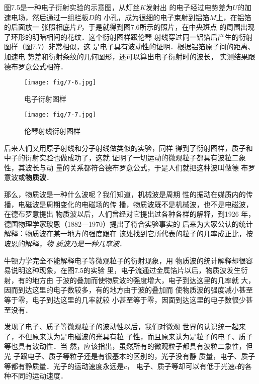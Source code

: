 图7.5是一种电子衍射实验的示意图，从灯丝$K$发射出
的电子经过电势差为$U$的加速电场，然后通过一组栏板$D$的
小孔，成为很细的电子束射到铝箔$M$上，在铝箔的后面放一
张照相底片$P$，于是就得到图7.6所示的照片，在中央斑点
的周围出现了环形的明暗相间的花纹．这个衍射图样跟伦琴
射线穿过同一铝箔后产生的衍射图样（图7.7）非常相似，这
是电子具有波动性的证明．根据铝箔原子间的距离、加速电
势差和衍射条纹的几何图形，还可以算出电子衍射时的波长，
实测结果跟德布罗意公式相符．
\begin{figure}[htp]
    \centering
    \begin{minipage}[t]{0.48\textwidth}
    \centering
    \texttt{[image: fig/7-6.jpg]}
    \caption{电子衍射图样}
    \end{minipage}
    \begin{minipage}[t]{0.48\textwidth}
    \centering
    \texttt{[image: fig/7-7.jpg]}
    \caption{伦琴射线衍射图样}
    \end{minipage}
    \end{figure}


后来人们又用原子射线和分子射线做类似的实验，同样
得到了衍射图样，质子和中子的衍射实验也做成功了，这就
证明了一切运动的微观粒子都具有波粒二象性，其波长与动
量的关系都符合德布罗意公式，于是人们就把这种波叫做德
布罗意波或\textbf{物质波}．

那么，物质波是一种什么波呢？我们知道，机械波是周期
性的振动在媒质内的传播，电磁波是周期变化的电磁场的传
播，物质波既不是机械波，也不是电磁波，在德布罗意提出
物质波以后，人们曾经对它提出过各种各样的解释，到1926
年，德国物理学家玻恩（1882—1970）提出了符合实验事实的
后来为大家公认的统计解释：物质波在某一地方的强度跟在
该处找到它所代表的粒子的几率成正比，按玻恩的解释，\textit{物
质波乃是一种几率波}．

牛顿力学完全不能解释电子等微观粒子的衍射现象，用
物质波的统计解释却很容易说明这种现象，在图7.5的实验
里，电子流通过金属箔片以后，物质波发生衍射，有的地方由
于波的叠加而使物质波的强度增大，电子到达这里的几率就
大，因而到达这里的电子数较多，有的地方由于波的叠加而
使物质波的强度减小甚至等于零，电子到达这里的几率就较
小甚至等于零，因面到达这里的电子数很少甚至没有．

发现了电子、质子等微观粒子的波动性以后，我们对微观
世界的认识统一起来了，不但原来认为是电磁波的光具有粒
子性，而且原来认为是粒子的电子、质子等也具有波动性．当
然，应该指出，虽然所有的微观粒子都具有波粒二象性，但光
子跟电子、质子等粒子还是有很基本的区别的，光子没有静
质量，电子、质子等都有静质量．光子的运动速度永远是$c$，
电子、质子等却可以有低于光速$c$的各种不同的运动速度．

